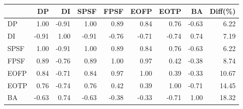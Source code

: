 \begin{tabular}{l|rrrrrrr|r}
\toprule
 & DP & DI & SPSF & FPSF & EOFP & EOTP & BA & Diff(\%)  \\
\midrule
DP & 1.00 & -0.91 & 1.00 & 0.89 & 0.84 & 0.76 & -0.63 & 6.22  \\
DI & -0.91 & 1.00 & -0.91 & -0.76 & -0.71 & -0.74 & 0.74 & 7.19  \\
SPSF & 1.00 & -0.91 & 1.00 & 0.89 & 0.84 & 0.76 & -0.63 & 6.22  \\
FPSF & 0.89 & -0.76 & 0.89 & 1.00 & 0.97 & 0.42 & -0.38 & 8.74  \\
EOFP & 0.84 & -0.71 & 0.84 & 0.97 & 1.00 & 0.39 & -0.33 & 10.67  \\
EOTP & 0.76 & -0.74 & 0.76 & 0.42 & 0.39 & 1.00 & -0.71 & 14.45  \\
BA & -0.63 & 0.74 & -0.63 & -0.38 & -0.33 & -0.71 & 1.00 & 18.32  \\
\bottomrule
\end{tabular}

